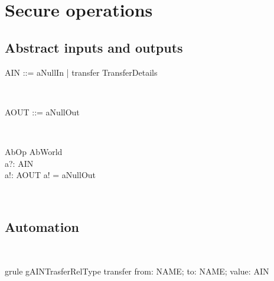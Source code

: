 \section{Secure operations}\label{ch3.secure.op}

\subsection{Abstract inputs and outputs}

\begin{LFType}
\begin{zed}
  AIN ::= aNullIn | transfer \ldata TransferDetails \rdata
\end{zed}~\end{LFType}

\begin{LFType}
\begin{zed}
  AOUT ::= aNullOut
\end{zed}~\end{LFType}

\begin{LSDef}
\begin{schema}{AbOp}
  \Delta AbWorld\\
  a?: AIN\\
  a!: AOUT
\where
  a! = aNullOut
\end{schema}~\end{LSDef}

\subsection*{Automation}

\begin{LGRT}
~\end{LGRT}

\begin{LGRT}
\begin{theorem}{grule gAINTrasferRelType}
    transfer \in  \lblot from: NAME; to: NAME; value: \nat \rblot  \rel  AIN
\end{theorem}~\end{LGRT}

